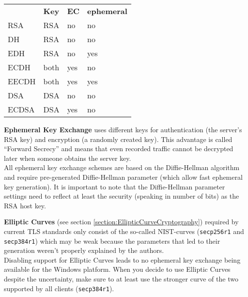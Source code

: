 \begin{center}
\begin{tabular}{llll}
    \toprule
          & \textbf{Key}  & \textbf{EC}  & \textbf{ephemeral} \\ \cmidrule(lr){1-4}
   RSA    & RSA           & no           & no                 \\
   DH     & RSA           & no           & no                 \\
   EDH    & RSA           & no           & yes                \\
   ECDH   & both          & yes          & no                 \\
   EECDH  & both          & yes          & yes                \\
   DSA    & DSA           & no           & no                 \\
   ECDSA  & DSA           & yes          & no                 \\
\bottomrule
\end{tabular}
\end{center}

\textbf{Ephemeral Key Exchange} uses different keys for authentication (the server's RSA
key) and encryption (a randomly created key). This advantage is called ``Forward
Secrecy'' and means that even recorded traffic cannot be decrypted later when someone
obtains the server key. \\
All ephemeral key exchange schemes are based on the Diffie-Hellman algorithm and require
pre-generated Diffie-Hellman parameter (which allow fast ephemeral key generation). It
is important to note that the Diffie-Hellman parameter settings need to reflect at least 
the security (speaking in number of bits) as the RSA host key. 


\textbf{Elliptic Curves} (see section \ref{section:EllipticCurveCryptography})
required by current TLS standards only consist of the so-called NIST-curves
(\texttt{secp256r1} and \texttt{secp384r1}) which may be weak because the
parameters that led to their generation weren't properly explained by the
authors\cite{DJBSC}. \\ Disabling support for Elliptic Curves leads to no
ephemeral key exchange being available for the Windows platform. When you
decide to use Elliptic Curves despite the uncertainty, make sure to at least
use the stronger curve of the two supported by all clients
(\texttt{secp384r1}).


